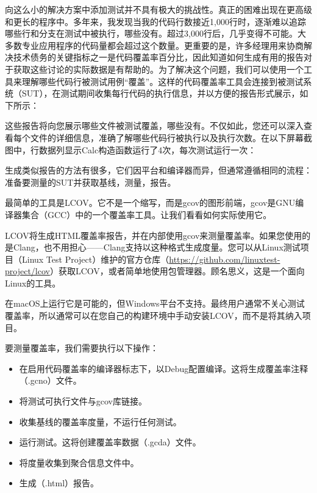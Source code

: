 
向这么小的解决方案中添加测试并不具有极大的挑战性。真正的困难出现在更高级和更长的程序中。多年来，我发现当我的代码行数接近1,000行时，逐渐难以追踪哪些行和分支在测试中被执行，哪些没有。超过3,000行后，几乎变得不可能。大多数专业应用程序的代码量都会超过这个数量。更重要的是，许多经理用来协商解决技术债务的关键指标之一是代码覆盖率百分比，因此知道如何生成有用的报告对于获取这些讨论的实际数据是有帮助的。为了解决这个问题，我们可以使用一个工具来理解哪些代码行被测试用例“覆盖”。这样的代码覆盖率工具会连接到被测试系统（SUT），在测试期间收集每行代码的执行信息，并以方便的报告形式展示，如下所示：


这些报告将向您展示哪些文件被测试覆盖，哪些没有。不仅如此，您还可以深入查看每个文件的详细信息，准确了解哪些代码行被执行以及执行次数。在以下屏幕截图中，行数据列显示Calc构造函数运行了4次，每次测试运行一次：


生成类似报告的方法有很多，它们因平台和编译器而异，但通常遵循相同的流程：准备要测量的SUT并获取基线，测量，报告。

最简单的工具是LCOV。它不是一个缩写，而是gcov的图形前端，gcov是GNU编译器集合（GCC）中的一个覆盖率工具。让我们看看如何实际使用它。


LCOV将生成HTML覆盖率报告，并在内部使用gcov来测量覆盖率。如果您使用的是Clang，也不用担心——Clang支持以这种格式生成度量。您可以从Linux测试项目（Linux Test Project）维护的官方仓库（\url{https://github.com/linuxtest-project/lcov}）获取LCOV，或者简单地使用包管理器。顾名思义，这是一个面向Linux的工具。

在macOS上运行它是可能的，但Windows平台不支持。最终用户通常不关心测试覆盖率，所以通常可以在您自己的构建环境中手动安装LCOV，而不是将其纳入项目。

要测量覆盖率，我们需要执行以下操作：

\begin{itemize}
\item
在启用代码覆盖率的编译器标志下，以Debug配置编译。这将生成覆盖率注释（.gcno）文件。

\item
将测试可执行文件与gcov库链接。

\item
收集基线的覆盖率度量，不运行任何测试。

\item
运行测试。这将创建覆盖率数据（.gcda）文件。

\item
将度量收集到聚合信息文件中。

\item
生成（.html）报告。
\end{itemize}

